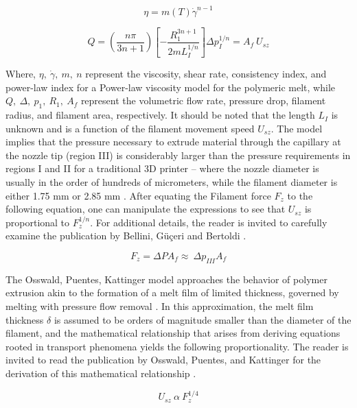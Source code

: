 \documentclass[main.tex]{subfiles}
\begin{document}
\begin{equation} \label{eq:plm}
	\eta=m\left(T\right){\dot{\gamma}}^{n-1}
\end{equation}

\begin{equation} \label{eq:vfr_mm}
	Q=\left(\frac{n\pi}{3n+1}\right)\left[-\frac{R_1^{3n+1}}{2mL_I^{1/n}}\right]\Delta p_I^{1/n}=A_f\ U_{sz}
\end{equation}

Where, $\eta,\ \dot{\gamma},\ m,\ n$ represent the viscosity, shear rate, consistency index, and power-law index for a Power-law viscosity model for the polymeric melt, while $Q,\ \Delta,\ p_1,\ R_1,\ A_f$ represent the volumetric flow rate, pressure drop, filament radius, and filament area, respectively. It should be noted that the length $L_I$ is unknown and is a function of the filament movement speed $U_{sz}$. The model implies that the pressure necessary to extrude material through the capillary at the nozzle tip (region III) is considerably larger than the pressure requirements in regions I and II for a traditional 3D printer – where the nozzle diameter is usually in the order of hundreds of micrometers, while the filament diameter is either 1.75 mm or 2.85 mm \cite{ColonQuintana2020,Oehlmann2021}. After equating the Filament force $F_z$ to the following equation, one can manipulate the expressions to see that $U_{sz}$ is proportional to $F_z^{1/n}$. For additional details, the reader is invited to carefully examine the publication by Bellini, Güçeri and Bertoldi \cite{Bellini2004}.

\begin{equation} \label{eq:force_bellini}
	F_z=\Delta PA_f\approx\ \Delta p_{III}A_f
\end{equation}

The Osswald, Puentes, Kattinger model approaches the behavior of polymer extrusion akin to the formation of a melt film of limited thickness, governed by melting with pressure flow removal \cite{OsswaldMelting18, ColonQuintana2020}. In this approximation, the melt film thickness $\delta$ is assumed to be orders of magnitude smaller than the diameter of the filament, and the mathematical relationship that arises from deriving equations rooted in transport phenomena yields the following proportionality. The reader is invited to read the publication by Osswald, Puentes, and Kattinger for the derivation of this mathematical relationship \cite{OsswaldMelting18}.

\begin{equation} \label{eq:force_osswald}
	U_{sz}\ \alpha\ F_z^{1/4}
\end{equation}   
\end{document}
